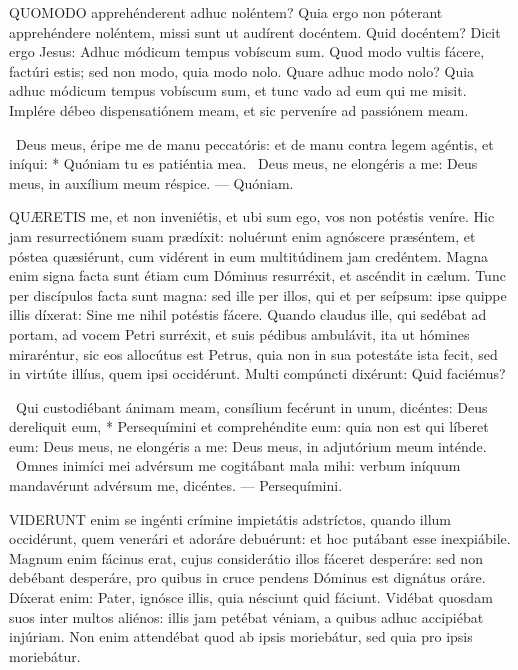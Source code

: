 
\lettrine[lines=2]{Q}{UOMODO} apprehénderent adhuc noléntem? Quia ergo non póterant apprehéndere noléntem, missi sunt ut audírent docéntem. Quid docéntem? Dicit ergo Jesus: Adhuc módicum tempus vobíscum sum. Quod modo vultis fácere, factúri estis; sed non modo, quia modo nolo. Quare adhuc modo nolo? Quia adhuc módicum tempus vobíscum sum, et tunc vado ad eum qui me misit. Implére débeo dispensatiónem meam, et sic perveníre ad passiónem meam.

\R\ Deus meus, éripe me de manu peccatóris: et de manu contra legem agéntis, et iníqui: * Quóniam tu es patiéntia mea. \V\ Deus meus, ne elongéris a me: Deus meus, in auxílium meum réspice. --- Quóniam.


\lettrine[lines=2]{Q}{UÆRETIS} me, et non inveniétis, et ubi sum ego, vos non potéstis veníre. Hic jam resurrectiónem suam prædíxit: noluérunt enim agnóscere præséntem, et póstea quæsiérunt, cum vidérent in eum multitúdinem jam credéntem. Magna enim signa facta sunt étiam cum Dóminus resurréxit, et ascéndit in cælum. Tunc per discípulos facta sunt magna: sed ille per illos, qui et per seípsum: ipse quippe illis díxerat: Sine me nihil potéstis fácere. Quando claudus ille, qui sedébat ad portam, ad vocem Petri surréxit, et suis pédibus ambulávit, ita ut hómines miraréntur, sic eos allocútus est Petrus, quia non in sua potestáte ista fecit, sed in virtúte illíus, quem ipsi occidérunt. Multi compúncti dixérunt: Quid faciémus?

\R\ Qui custodiébant ánimam meam, consílium fecérunt in unum, dicéntes: Deus dereliquit eum, * Persequímini et comprehéndite eum: quia non est qui líberet eum: Deus meus, ne elongéris a me: Deus meus, in adjutórium meum inténde. \V\ Omnes inimíci mei advérsum me cogitábant mala mihi: verbum iníquum mandavérunt advérsum me, dicéntes. --- Persequímini.


\lettrine[lines=2]{V}{IDERUNT} enim se ingénti crímine impietátis adstríctos, quando illum occidérunt, quem venerári et adoráre debuérunt: et hoc putábant esse inexpiábile. Magnum enim fácinus erat, cujus considerátio illos fáceret desperáre: sed non debébant desperáre, pro quibus in cruce pendens Dóminus est dignátus oráre. Díxerat enim: Pater, ignósce illis, quia nésciunt quid fáciunt. Vidébat quosdam suos inter multos aliénos: illis jam petébat véniam, a quibus adhuc accipiébat injúriam. Non enim attendébat quod ab ipsis moriebátur, sed quia pro ipsis moriebátur.

